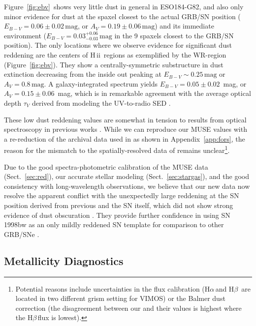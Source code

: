 \documentclass[traditabstract]{aa}
\newcommand{\hb}{H$\beta$}
\newcommand{\ha}{H$\alpha$}
\newcommand{\hii}{\mbox{H\,{\sc ii}}}
\begin{document}
Figure~\ref{fig:ebv}~shows very little dust in general in ESO184-G82, and also only minor evidence for dust at the spaxel closest to the actual GRB/SN position ($E_{B-V} = 0.06\pm0.02\,\mathrm{mag}$, or $A_V = 0.19\pm0.06\,\mathrm{mag}$) and its immediate environment ($E_{B-V} = 0.03_{-0.03}^{+0.06}\,\mathrm{mag}$ in the 9 spaxels closest to the GRB/SN position). The only locations where we observe evidence for significant dust reddening are the centers of \hii\, regions as exemplified by the WR-region (Figure~\ref{fig:ebv}). They show a centrally-symmetric substructure in dust extinction decreasing from the inside out peaking at $E_{B-V} \sim 0.25\,\mathrm{mag}$ or $A_V = 0.8\,\mathrm{mag}$. A galaxy-integrated spectrum yields $E_{B-V} = 0.05\pm0.02$~mag, or $A_V=0.15\pm0.06$~mag, which is in remarkable agreement with the average optical depth $\tau_V$ derived from modeling the UV-to-radio SED \citep{2014A&A...562A..70M}.

These low dust reddening values are somewhat in tension to results from optical spectroscopy in previous works \citep{2006A&A...454..103H, 2008A&A...490...45C}. While we can reproduce our MUSE values with a re-reduction of the archival data used in \citet{2006A&A...454..103H} as shown in Appendix~\ref{app:fors}, the reason for the mismatch to the spatially-resolved data of \citet{2008A&A...490...45C} remains unclear\footnote{Potential reasons include uncertainties in the flux calibration (\ha\,and \hb\, are located in two different grism setting for VIMOS) or the Balmer dust correction (the disagreement between our and their values is highest where the \hb\,flux is lowest).}.

Due to the good spectra-photometric calibration of the MUSE data (Sect.~\ref{sec:red}), our accurate stellar modeling (Sect.~\ref{sec:stargas}), and the good consistency with long-wavelength observations, we believe that our new data now resolve the apparent conflict with the unexpectedly large reddening at the SN position derived from previous  and the SN itself, which did not show strong evidence of dust obscuration \citep[e.g.][]{1998Natur.395..672I, 2001ApJ...555..900P}. They provide further confidence in using SN\,1998bw as an only mildly reddened SN template for comparison to other GRB/SNe \citep[e.g.][and references therein]{2004ApJ...609..952Z, 2014A&A...566A.102S, 2016arXiv160606791K}.

\subsection{Metallicity Diagnostics}
\end{document}
